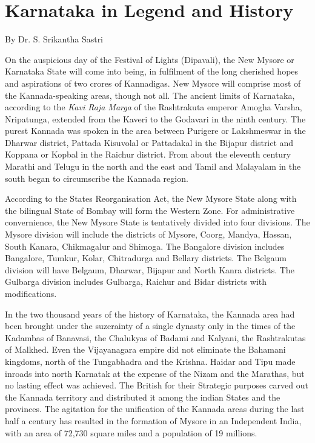 \documentclass{book}
\begin{document}
\chapter*{Karnataka in Legend and History}

{By Dr. S. Srikantha Sastri}

On the auspicious day of the Festival of Lights (Dipavali), the New
Mysore or Karnataka State will come into being, in fulfilment of the
long cherished hopes and aspirations of two crores of Kannadigas. New
Mysore will comprise most of the Kannada-speaking areas, though not
all. The ancient limits of Karnataka, according to the \textit{Kavi
  Raja Marga} of the Rashtrakuta emperor Amogha Varsha, Nripatunga,
extended from the Kaveri to the Godavari in the ninth century. The
purest Kannada was spoken in the area between Purigere or Lakshmeswar
in the Dharwar district, Pattada Kisuvolal or Pattadakal in the
Bijapur district and Koppana or Kopbal in the Raichur district. From
about the eleventh century Marathi and Telugu in the north and the
east and Tamil and Malayalam in the south began to circumscribe the
Kannada region.

According to the States Reorganisation Act, the New Mysore State along
with the bilingual State of Bombay will form the Western Zone. For
administrative convernience, the New Mysore State is tentatively
divided into four divisions. The Mysore division will include the
districts of Mysore, Coorg, Mandya, Hassan, South Kanara, Chikmagalur
and Shimoga. The Bangalore division includes Bangalore, Tumkur, Kolar,
Chitradurga and Bellary districts. The Belgaum division will have
Belgaum, Dharwar, Bijapur and North Kanra districts. The Gulbarga
division includes Gulbarga, Raichur and Bidar districts with modifications.

In the two thousand years of the history of Karnataka, the Kannada
area had been brought under the suzerainty of a single dynasty only in
the times of the Kadambas of Banavasi, the Chalukyas of Badami and
Kalyani, the Rashtrakutas of Malkhed. Even the Vijayanagara empire
did not eliminate the Bahamani kingdoms, north of the Tungabhadra and
the Krishna. Haidar and Tipu made inroads into north Karnatak at the
expense of the Nizam and the Marathas, but no lasting effect was
achieved. The British for their Strategic purposes carved out the
Kannada territory and distributed it among the indian States and the
provinces. The agitation for the unification of the Kannada areas
during the last half a century has resulted in the formation of Mysore
in an Independent India, with an area of 72,730 square miles and a
population of 19 millions.
\end{document}
